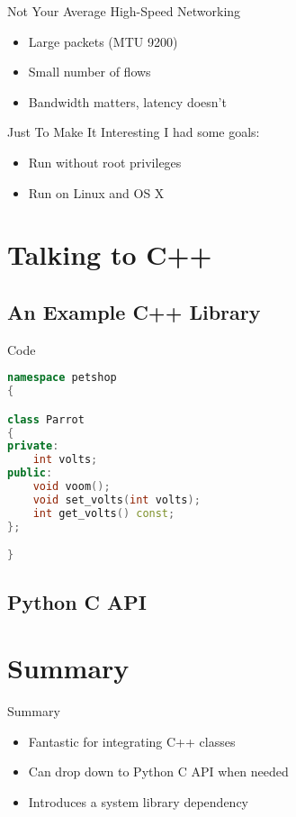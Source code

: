 \documentclass{beamer}
\begin{document}
\begin{frame}{Not Your Average High-Speed Networking}
  \begin{itemize}
    \item Large packets (MTU 9200)
    \item Small number of flows
    \item Bandwidth matters, latency doesn't
  \end{itemize}
\end{frame}

\begin{frame}{Just To Make It Interesting}
  I had some goals:
  \begin{itemize}
    \item Run without root privileges
    \item Run on Linux and OS X
  \end{itemize}
\end{frame}

\section{Talking to C++}

\subsection{An Example C++ Library}

\begin{frame}[fragile=singleslide]{Code}
\begin{lstlisting}[language=c++]
namespace petshop
{

class Parrot
{
private:
    int volts;
public:
    void voom();
    void set_volts(int volts);
    int get_volts() const;
};

}
\end{lstlisting}
\end{frame}

\subsection{Python C API}


\section*{Summary}

\begin{frame}{Summary}
  \begin{itemize}
    \item Fantastic for integrating C++ classes
    \item Can drop down to Python C API when needed
    \item Introduces a system library dependency
  \end{itemize}
\end{frame}
\end{document}
